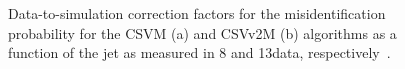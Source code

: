 \begin{figure}[!htb]
\begin{center}
\end{center} 
\caption{Data-to-simulation correction factors for the misidentification probability for the CSVM (a) and CSVv2M (b) algorithms as a function of the jet \pt as measured in 8 and 13\TeV data, respectively~\cite{CMS:BTV13001,CMS-PAS-BTV-15-001}.}
\label{fig:btag_sfl}
\end{figure}